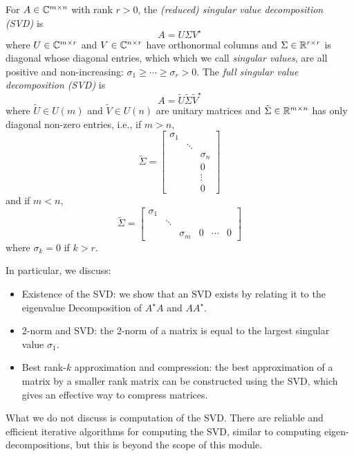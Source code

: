 \begin{definition} For $A \in {\mathbb C}^{m \times n}$ with rank $r > 0$,  the \emph{(reduced) singular value decomposition (SVD)} is
\[
A = U \ensuremath{\Sigma} V^\ensuremath{\star}
\]
where $U \in {\mathbb C}^{m \times r}$ and $V \in  {\mathbb C}^{n \times r}$ have orthonormal columns and $\Sigma \in {\mathbb R}^{r \times r}$ is  diagonal whose diagonal entries, which which we call \emph{singular values}, are all positive and non-increasing: $\ensuremath{\sigma}_1 \ensuremath{\geq} \ensuremath{\cdots} \ensuremath{\geq} \ensuremath{\sigma}_r > 0$. The \emph{full singular value decomposition (SVD)} is
\[
A = \tilde{U} \tilde{\Sigma} \tilde{V}^\ensuremath{\star}
\]
where $\tilde{U} \ensuremath{\in} U(m)$ and $\tilde{V} \ensuremath{\in}  U(n)$ are unitary matrices and $\tilde{\Sigma} \in {\mathbb R}^{m \times n}$ has only diagonal non-zero entries, i.e., if $m > n$,
\[
\tilde{\Sigma} = \begin{bmatrix} \ensuremath{\sigma}_1 \\ & \ensuremath{\ddots} \\ && \ensuremath{\sigma}_n \\ && 0 \\ && \ensuremath{\vdots} \\ && 0 \end{bmatrix}
\]
and if $m < n$,
\[
\tilde{\Sigma} = \begin{bmatrix} \ensuremath{\sigma}_1 \\ & \ensuremath{\ddots} \\ && \ensuremath{\sigma}_m & 0 & \ensuremath{\cdots} & 0\end{bmatrix}
\]
where $\ensuremath{\sigma}_k = 0$ if $k > r$. \end{definition}

In particular, we discuss:

\begin{itemize}
\item[1. ] Existence of the SVD: we show that an SVD exists by relating it to the eigenvalue Decomposition of $A^\ensuremath{\star}A$ and $AA^\ensuremath{\star}$.


\item[2. ] 2-norm and SVD: the 2-norm of a matrix is equal to  the largest singular value $\ensuremath{\sigma}_1$.


\item[3. ] Best rank-$k$ approximation and compression: the best approximation of a matrix by a smaller rank matrix can be constructed using the SVD, which gives an effective way to compress matrices. 

\end{itemize}
What we do not discuss is computation of the SVD. There are reliable and efficient iterative algorithms for computing the SVD, similar to computing eigen-decompositions, but this is beyond the scope of this module.

